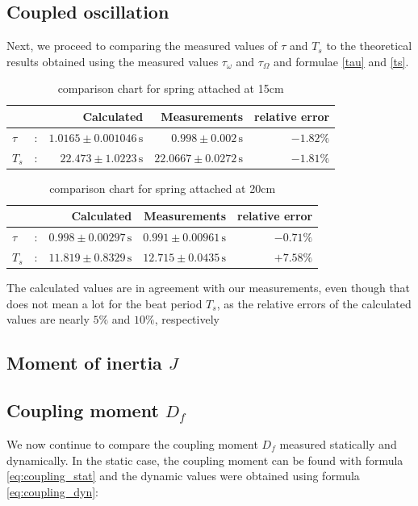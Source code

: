 \documentclass{scrreprt}
\newcommand{\unit}[1]{\ensuremath{\, \mathrm{#1}}}
\begin{document}
\subsection{Coupled oscillation}
Next, we proceed to comparing the measured values of $\tau$ and $T_s$ to the theoretical results obtained using the measured values $\tau_\omega$ and $\tau_\Omega$ and formulae \ref{tau} and \ref{ts}.
\begin{table}[H]
	\centering
	\begin{tabular}{lcrrr}
	&&Calculated&Measurements&relative error\\ \hline
	$\tau$&:& $1.0165 \pm	0.001046 \unit{s}$&$0.998 \pm 0.002 \unit{s}$&$-1.82\% $\\
	$T_s$ &:& $22.473  \pm 1.0223\unit{s}$ &$22.0667 \pm 0.0272\unit{s}$ & $-1.81\%$\\
	\end{tabular}
	\caption{comparison chart for spring attached at 15cm}
\end{table}

\begin{table}[H]
	\centering
	\begin{tabular}{lcrrr}
	&&Calculated&Measurements&relative error\\  \hline
	$\tau$&:& $0.998 \pm 0.00297 \unit{s}$&$0.991 \pm	0.00961\unit{s}$&$-0.71\% $\\
	$T_s$ &:& $11.819 \pm 0.8329\unit{s}$ &$12.715 \pm	0.0435\unit{s}$ & $+7.58\%$\\
	\end{tabular}
	\caption{comparison chart for spring attached at 20cm}
\end{table}

The calculated values are in agreement with our measurements, even though that does not mean a lot for the beat period $T_s$, as the relative errors of the calculated values are nearly $5\%$ and $10\%$, respectively

\subsection{Moment of inertia $J$}


\subsection{Coupling moment $D_f$}
We now continue to compare the coupling moment $D_f$ measured statically and dynamically. In the static case, the coupling moment can be found with formula \ref{eq:coupling_stat} and the dynamic values were obtained using formula \ref{eq:coupling_dyn}:
\end{document}

